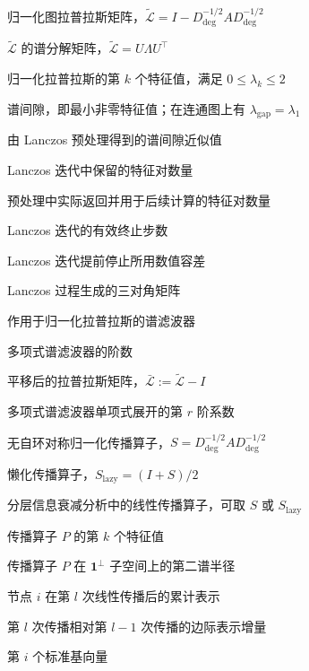 \begin{denotation}[4.0cm]
  \item[$\tilde{\mathcal{L}}$] 归一化图拉普拉斯矩阵，$\tilde{\mathcal{L}}=I-D_{\mathrm{deg}}^{-1/2}AD_{\mathrm{deg}}^{-1/2}$
  \item[$U,\Lambda$] $\tilde{\mathcal{L}}$ 的谱分解矩阵，$\tilde{\mathcal{L}}=U\Lambda U^\top$
  \item[$\lambda_k$] 归一化拉普拉斯的第 $k$ 个特征值，满足 $0\le \lambda_k\le 2$
  \item[$\lambda_{\mathrm{gap}}$] 谱间隙，即最小非零特征值；在连通图上有 $\lambda_{\mathrm{gap}}=\lambda_1$
  \item[$\hat{\lambda}_{\mathrm{gap}}$] 由 Lanczos 预处理得到的谱间隙近似值
  \item[$K_{\mathrm{eig}}$] Lanczos 迭代中保留的特征对数量
  \item[$K_{\mathrm{pair}}$] 预处理中实际返回并用于后续计算的特征对数量
  \item[$K_{\mathrm{eff}}$] Lanczos 迭代的有效终止步数
  \item[$\tau_{\mathrm{tol}}$] Lanczos 迭代提前停止所用数值容差
  \item[$T_{K_{\mathrm{eff}}}$] Lanczos 过程生成的三对角矩阵
  \item[$g(\tilde{\mathcal{L}})$] 作用于归一化拉普拉斯的谱滤波器
  \item[$K_{\mathrm{poly}}$] 多项式谱滤波器的阶数
  \item[$\bar{\mathcal{L}}$] 平移后的拉普拉斯矩阵，$\bar{\mathcal{L}}:=\tilde{\mathcal{L}}-I$
  \item[$a_r$] 多项式谱滤波器单项式展开的第 $r$ 阶系数
  \item[$S$] 无自环对称归一化传播算子，$S=D_{\mathrm{deg}}^{-1/2}AD_{\mathrm{deg}}^{-1/2}$
  \item[$S_{\mathrm{lazy}}$] 懒化传播算子，$S_{\mathrm{lazy}}=(I+S)/2$
  \item[$P$] 分层信息衰减分析中的线性传播算子，可取 $S$ 或 $S_{\mathrm{lazy}}$
  \item[$\mu_k(P)$] 传播算子 $P$ 的第 $k$ 个特征值
  \item[$\mu_\star(P)$] 传播算子 $P$ 在 $\mathbf{1}^{\perp}$ 子空间上的第二谱半径
  \item[$h_i^{[l]}$] 节点 $i$ 在第 $l$ 次线性传播后的累计表示
  \item[$\Delta h_i^{[l]}$] 第 $l$ 次传播相对第 $l-1$ 次传播的边际表示增量
  \item[$e_i$] 第 $i$ 个标准基向量

\end{denotation}
